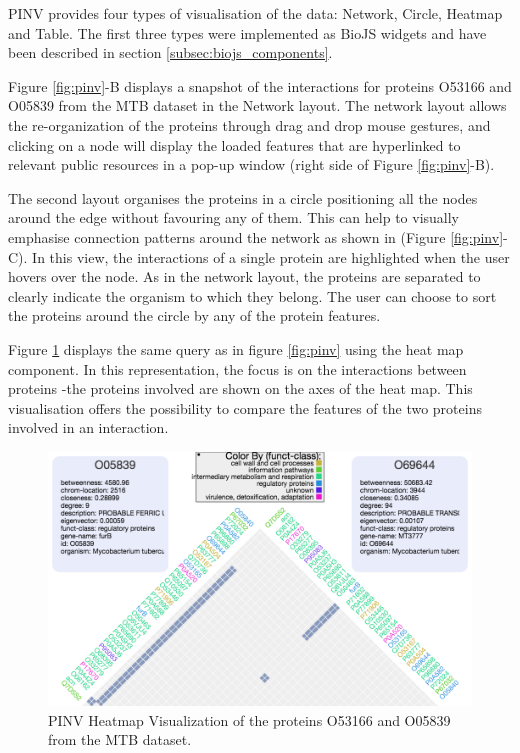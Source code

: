 PINV provides four types of visualisation of the data: Network, Circle, Heatmap and Table. The first three types were implemented as BioJS widgets and have been described in section \ref{subsec:biojs_components}. 

Figure \ref{fig:pinv}-B displays a snapshot of the interactions for proteins O53166 and O05839 from the MTB dataset in the Network layout. The network layout allows the re-organization of the proteins through drag and drop mouse gestures, and clicking on a node will display the loaded features that are hyperlinked to relevant public resources in a pop-up window (right side of Figure \ref{fig:pinv}-B).

The second layout organises the proteins in a circle positioning all the nodes around the edge without favouring any of them. This can help to visually emphasise connection patterns around the network as shown in (Figure \ref{fig:pinv}-C). In this view, the interactions of a single protein are highlighted when the user hovers over the node. As in the network layout, the proteins are separated to clearly indicate the organism to which they belong. The user can choose to sort the proteins around the circle by any of the protein features.

Figure \ref{fig:pinv_heatmap} displays the same query as in figure \ref{fig:pinv} using the heat map component. In this representation, the focus is on the interactions between proteins -the proteins involved are shown on the axes of the heat map. This visualisation offers the possibility to compare the features of the two proteins involved in an interaction.

\begin{figure}[ht]
\centering
\includegraphics[width=\textwidth]{figures/pinv_heatmap.png}
\caption[PINV Heatmap Visualization.]{PINV Heatmap Visualization of the proteins O53166 and O05839 from the MTB dataset.
\label{fig:pinv_heatmap}}
\end{figure}


